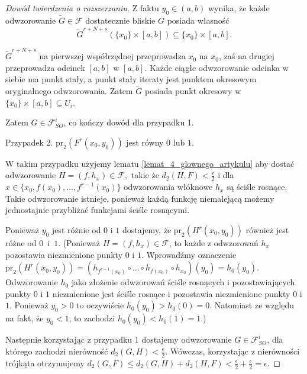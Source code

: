 \documentclass[licencjacka]{pwr_wmat_praca_dyplomowa}
\theoremstyle{plain}
\numberwithin{theorem}{chapter}
\theoremstyle{definition}
\numberwithin{theorem}{chapter}
\begin{document}
\begin{proof}[Dowód twierdzenia o rozszerzaniu]
Z faktu $y_0 \in (a, b)$ wynika, że każde odwzorowanie $\widetilde{G} \in \mathcal{F}$ dostatecznie bliskie $G$ posiada własność
$$\widetilde{G}^{r+N+s}(\{x_0\} \times [a, b]) \subseteq \{x_0\} \times [a, b].$$

$\widetilde G^{r+N+s}$ na pierwszej współrzędnej przeprowadza $x_0$ na $x_0$, zaś na drugiej przeprowadza odcinek $[a,b]$ w $[a,b]$. Każde ciągłe odwzorowanie odcinka w siebie ma punkt stały, a punkt stały iteraty jest punktem okresowym oryginalnego odwzorowania.
Zatem $\widetilde{G}$ posiada punkt okresowy w $\{x_0\} \times [a, b] \subseteq U_i$.

Zatem $G \in \mathcal{F}_{SO}^i$, co kończy dowód dla przypadku 1.

Przypadek 2. $\textrm{pr}_2(F^r(x_0, y_0))$ jest równy $0$ lub $1$.

W takim przypadku użyjemy lematu \ref{lemat_4_glownego_artykulu} aby dostać odwzorowanie $H = (f, h_x) \in \mathcal{F},$ takie że $d_2(H, F) < \frac{\epsilon}{2}$ i dla $x \in \{x_0, f(x_0), \ldots, f^{r-1}(x_0)\}$ odwzorowania włóknowe $h_x$ są ściśle rosnące. Takie odwzorowanie istnieje, ponieważ każdą funkcję niemalejącą możemy jednostajnie przybliżać funkcjami ściśle rosnącymi.

 
Ponieważ $y_0$ jest różnie od $0$ i $1$ dostajemy, że $\textrm{pr}_2(H^r(x_0, y_0))$ również jest różne od $0$~i~$1$. (Ponieważ $H = (f, h_x) \in \mathcal{F}$, to każde z odwzorowań $h_x$ pozostawia niezmienione punkty $0$ i $1$. Wprowadźmy oznaczenie $\textrm{pr}_2(H^r(x_0, y_0)) = (h_{f^{r-1}(x_0)} \circ \ldots \circ h_{f(x_0)} \circ h_{x_0})(y_0) = h_0(y_0)$. Odwzorowanie $h_0$ jako złożenie odwzorowań ściśle rosnących i pozostawiających punkty $0$ i $1$ niezmienione jest ściśle rosnące i pozostawia niezmienione punkty $0$ i $1$.  Ponieważ $y_0 > 0$ to oczywiście $h_0(y_0) > h_0(0) = 0$. Natomiast ze względu na fakt, że $y_0 < 1$, to zachodzi $h_0(y_0) < h_0(1) = 1$.)
 
Następnie korzystając z przypadku 1 dostajemy odwzorowanie $G \in \mathcal{F}_{SO}^i$, dla którego zachodzi nierówność $d_2(G, H) < \frac{\epsilon}{2}$. Wówczas, korzystając z nierówności trójkąta otrzymujemy $d_2(G, F) \leq d_2(G, H) + d_2(H, F) < \frac{\epsilon}{2} + \frac{\epsilon}{2} = \epsilon$.


\end{proof}




\end{document}
